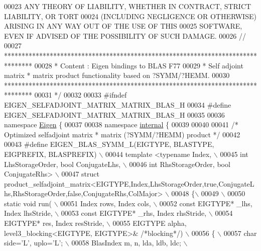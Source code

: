 \begin{DoxyCode}
00023 \textcolor{comment}{ ANY THEORY OF LIABILITY, WHETHER IN CONTRACT, STRICT LIABILITY, OR TORT}
00024 \textcolor{comment}{ (INCLUDING NEGLIGENCE OR OTHERWISE) ARISING IN ANY WAY OUT OF THE USE OF THIS}
00025 \textcolor{comment}{ SOFTWARE, EVEN IF ADVISED OF THE POSSIBILITY OF SUCH DAMAGE.}
00026 \textcolor{comment}{//}
00027 \textcolor{comment}{ ********************************************************************************}
00028 \textcolor{comment}{ *   Content : Eigen bindings to BLAS F77}
00029 \textcolor{comment}{ *   Self adjoint matrix * matrix product functionality based on ?SYMM/?HEMM.}
00030 \textcolor{comment}{ ********************************************************************************}
00031 \textcolor{comment}{*/}
00032 
00033 \textcolor{preprocessor}{#ifndef EIGEN\_SELFADJOINT\_MATRIX\_MATRIX\_BLAS\_H}
00034 \textcolor{preprocessor}{#define EIGEN\_SELFADJOINT\_MATRIX\_MATRIX\_BLAS\_H}
00035 
00036 \textcolor{keyword}{namespace }\hyperlink{namespace_eigen}{Eigen} \{ 
00037 
00038 \textcolor{keyword}{namespace }\hyperlink{namespaceinternal}{internal} \{
00039 
00040 
00041 \textcolor{comment}{/* Optimized selfadjoint matrix * matrix (?SYMM/?HEMM) product */}
00042 
00043 \textcolor{preprocessor}{#define EIGEN\_BLAS\_SYMM\_L(EIGTYPE, BLASTYPE, EIGPREFIX, BLASPREFIX) \(\backslash\)}
00044 \textcolor{preprocessor}{template <typename Index, \(\backslash\)}
00045 \textcolor{preprocessor}{          int LhsStorageOrder, bool ConjugateLhs, \(\backslash\)}
00046 \textcolor{preprocessor}{          int RhsStorageOrder, bool ConjugateRhs> \(\backslash\)}
00047 \textcolor{preprocessor}{struct
       product\_selfadjoint\_matrix<EIGTYPE,Index,LhsStorageOrder,true,ConjugateLhs,RhsStorageOrder,false,ConjugateRhs,ColMajor> \(\backslash\)}
00048 \textcolor{preprocessor}{\{\(\backslash\)}
00049 \textcolor{preprocessor}{\(\backslash\)}
00050 \textcolor{preprocessor}{  static void run( \(\backslash\)}
00051 \textcolor{preprocessor}{    Index rows, Index cols, \(\backslash\)}
00052 \textcolor{preprocessor}{    const EIGTYPE* \_lhs, Index lhsStride, \(\backslash\)}
00053 \textcolor{preprocessor}{    const EIGTYPE* \_rhs, Index rhsStride, \(\backslash\)}
00054 \textcolor{preprocessor}{    EIGTYPE* res,        Index resStride, \(\backslash\)}
00055 \textcolor{preprocessor}{    EIGTYPE alpha, level3\_blocking<EIGTYPE, EIGTYPE>& }\textcolor{comment}{/*blocking*/}\textcolor{preprocessor}{) \(\backslash\)}
00056 \textcolor{preprocessor}{  \{ \(\backslash\)}
00057 \textcolor{preprocessor}{    char side='L', uplo='L'; \(\backslash\)}
00058 \textcolor{preprocessor}{    BlasIndex m, n, lda, ldb, ldc; \(\backslash\)}

\end{DoxyCode}
